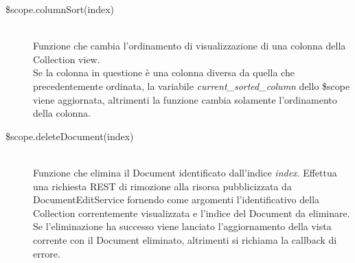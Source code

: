 \begin{description}
\begin{description}
  \item[\$scope.columnSort(index)] \hfill \\
  Funzione che cambia l'ordinamento di visualizzazione di una colonna della Collection view. \\
  Se la colonna in questione è una colonna diversa da quella che precedentemente ordinata,
  la variabile \emph{current\_sorted\_column} dello \$scope viene aggiornata, altrimenti la funzione cambia solamente
  l'ordinamento della colonna.
  
  \item[\$scope.deleteDocument(index)] \hfill \\
  Funzione che elimina il Document identificato dall'indice \emph{index}. Effettua una richiesta REST di rimozione alla risorsa
  pubblicizzata da DocumentEditService fornendo come argomenti l'identificativo della Collection correntemente visualizzata e l'indice
  del Document da eliminare. \\
  Se l'eliminazione ha successo viene lanciato l'aggiornamento della vista corrente con il Document eliminato, altrimenti si
  richiama la callback di errore.
  
 \end{description}
\end{description}

